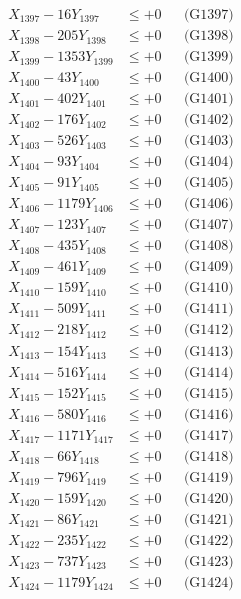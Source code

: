 \documentclass[a4paper,10pt]{article}
\begin{document}
{\begin{align}
X_{1397} - 16Y_{1397} &\leq +0 && \text{(G1397)} \\
X_{1398} - 205Y_{1398} &\leq +0 && \text{(G1398)} \\
X_{1399} - 1353Y_{1399} &\leq +0 && \text{(G1399)} \\
X_{1400} - 43Y_{1400} &\leq +0 && \text{(G1400)} \\
\allowbreak
X_{1401} - 402Y_{1401} &\leq +0 && \text{(G1401)} \\
X_{1402} - 176Y_{1402} &\leq +0 && \text{(G1402)} \\
X_{1403} - 526Y_{1403} &\leq +0 && \text{(G1403)} \\
X_{1404} - 93Y_{1404} &\leq +0 && \text{(G1404)} \\
X_{1405} - 91Y_{1405} &\leq +0 && \text{(G1405)} \\
X_{1406} - 1179Y_{1406} &\leq +0 && \text{(G1406)} \\
X_{1407} - 123Y_{1407} &\leq +0 && \text{(G1407)} \\
X_{1408} - 435Y_{1408} &\leq +0 && \text{(G1408)} \\
X_{1409} - 461Y_{1409} &\leq +0 && \text{(G1409)} \\
X_{1410} - 159Y_{1410} &\leq +0 && \text{(G1410)} \\
\allowbreak
X_{1411} - 509Y_{1411} &\leq +0 && \text{(G1411)} \\
X_{1412} - 218Y_{1412} &\leq +0 && \text{(G1412)} \\
X_{1413} - 154Y_{1413} &\leq +0 && \text{(G1413)} \\
X_{1414} - 516Y_{1414} &\leq +0 && \text{(G1414)} \\
X_{1415} - 152Y_{1415} &\leq +0 && \text{(G1415)} \\
X_{1416} - 580Y_{1416} &\leq +0 && \text{(G1416)} \\
X_{1417} - 1171Y_{1417} &\leq +0 && \text{(G1417)} \\
X_{1418} - 66Y_{1418} &\leq +0 && \text{(G1418)} \\
X_{1419} - 796Y_{1419} &\leq +0 && \text{(G1419)} \\
X_{1420} - 159Y_{1420} &\leq +0 && \text{(G1420)} \\
\allowbreak
X_{1421} - 86Y_{1421} &\leq +0 && \text{(G1421)} \\
X_{1422} - 235Y_{1422} &\leq +0 && \text{(G1422)} \\
X_{1423} - 737Y_{1423} &\leq +0 && \text{(G1423)} \\
X_{1424} - 1179Y_{1424} &\leq +0 && \text{(G1424)} \\

\end{align}}
\end{document}
